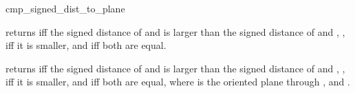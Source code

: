 \begin{ccRefFunction}{cmp_signed_dist_to_plane}

          {returns 
           iff the signed distance of  and 
            is larger than the signed distance of 
           and , , iff it is smaller,
           and  iff both are equal.}

          {returns 
           iff the signed distance of  and 
            is larger than the signed distance of 
           and , , iff it is smaller,
           and  iff both are equal, where
            is the oriented plane through ,  and
           .}
         {}
\end{ccRefFunction}

